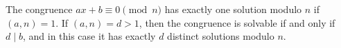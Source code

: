 The congruence $ax + b \equiv 0 \pmod{n}$ has exactly one solution modulo $n$ if $(a,n) = 1$. If $(a,n) = d > 1$, then the congruence is solvable if and only if $d \mid b$, and in this case it has exactly $d$ distinct solutions modulo $n$.
